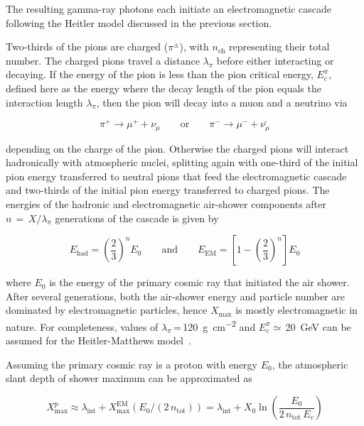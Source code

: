 \noindent
The resulting gamma-ray photons each initiate an electromagnetic cascade following the Heitler model discussed in the previous section.

Two-thirds of the pions are charged ($\pi^{\pm}$), with $n_{\text{ch}}$ representing their total number.
The charged pions travel a distance $\lambda_{\pi}$ before either interacting or decaying.
If the energy of the pion is less than the pion critical energy, $E_{c}^{\pi}$, defined here as the energy where the decay length of the pion equals the interaction length $\lambda_{\pi}$, then the pion will decay into a muon and a neutrino via

\begin{equation}
    \pi^{+} \rightarrow \mu^{+} + \nu_{\mu} \qquad \text{or} \qquad \pi^{-} \rightarrow \mu^{-} + \bar{\nu_{\mu}} \label{eq:pion_decay}
\end{equation}

\noindent
depending on the charge of the pion.
Otherwise the charged pions will interact hadronically with atmospheric nuclei, splitting again with one-third of the initial pion energy transferred to neutral pions that feed the electromagnetic cascade and two-thirds of the initial pion energy transferred to charged pions.
The energies of the hadronic and electromagnetic air-shower components after $n\,=\,X / \lambda_{\pi}$ generations of the cascade is given by

\begin{equation}
    E_{\text{had}} = \left( \frac{2}{3} \right)^{n} E_{0} \qquad \text{and} \qquad E_{\text{EM}} = \left[ 1 - \left( \frac{2}{3} \right)^{n} \right] E_{0} \label{eq:shower_energies}
\end{equation}

\noindent
where $E_{0}$ is the energy of the primary cosmic ray that initiated the air shower.
After several generations, both the air-shower energy and particle number are dominated by electromagnetic particles, hence $X_\text{max}$ is mostly electromagnetic in nature.
For completeness, values of $\lambda_{\pi}$\,=\,\qty{120}{\gram\per\centi\meter\squared} and $E_{c}^{\pi}\simeq$\,\qty{20}{\giga\electronvolt} can be assumed for the Heitler-Matthews model~\cite{matthews_astropartphys2005_heitlermatthews}.

Assuming the primary cosmic ray is a proton with energy $E_{0}$, the atmospheric slant depth of shower maximum can be approximated as

\begin{equation}
    X_{\text{max}}^{p} \approx \lambda_{\text{int}} + X_{\text{max}}^{\text{EM}}\left( E_{0} / \left(2\,n_{\text{tot}}\right) \right) = \lambda_{\text{int}} + X_{0} \ln\left( \frac{E_{0}}{2\,n_{\text{tot}}\,E_{c}} \right) \label{eq:proton_xmax}
\end{equation}

